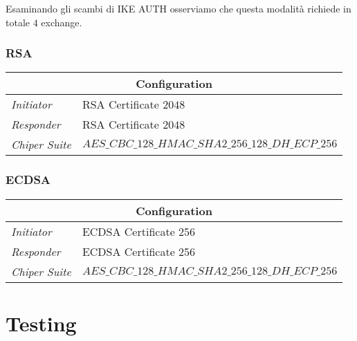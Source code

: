\documentclass[
10pt, %
a4paper, %
oneside, %
headinclude,footinclude, %
BCOR5mm, %
]{scrartcl}
\begin{document}
\noindent
Esaminando gli scambi di IKE AUTH osserviamo che questa modalità richiede in totale $4$ exchange. 

\subsubsection{RSA}

\begin{center}
    \setlength{\arrayrulewidth}{0.4mm}
    \renewcommand{\arraystretch}{1.3}
    \begin{tabular}{|l|l|}
        \hline
        \multicolumn{2}{|c|}{\textbf{Configuration}} \\
        \hline
        \textit{Initiator} & RSA Certificate $2048$ \\
        \textit{Responder} & RSA Certificate $2048$ \\
        \textit{Chiper Suite} & $AES\_CBC\_128\_HMAC\_SHA2\_256\_128\_DH\_ECP\_256$ \\
        \hline
    \end{tabular}
\end{center}

\subsubsection{ECDSA}

\begin{center}
    \setlength{\arrayrulewidth}{0.4mm}
    \renewcommand{\arraystretch}{1.3}
    \begin{tabular}{|l|l|}
        \hline
        \multicolumn{2}{|c|}{\textbf{Configuration}} \\
        \hline
        \textit{Initiator} & ECDSA Certificate 256\\
        \textit{Responder} & ECDSA Certificate 256 \\
        \textit{Chiper Suite} & $AES\_CBC\_128\_HMAC\_SHA2\_256\_128\_DH\_ECP\_256$ \\
        \hline
    \end{tabular}
\end{center}


\newpage
\section{Testing}
\end{document}
